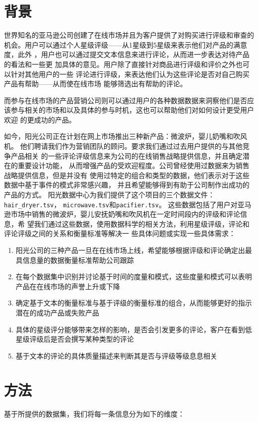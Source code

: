 \chapter{背景}
    世界知名的亚马逊公司创建了在线市场并且为客户提供了对购买进行评级和审查的
机会。用户可以通过个人星级评级——从1星级到5星级来表示他们对产品的满意度，此外
，用户也可以通过提交文本信息来进行评论，从而进一步表达对待产品的看法和一些更
加具体的意见。用户除了直接针对商品进行评级和评价之外也可以针对其他用户的一些
评论进行评级，来表达他们认为这些评论是否对自己购买产品有帮助——从而使在线市场
能够筛选出有帮助的评论。

    而参与在线市场的产品营销公司则可以通过用户的各种数据数据来洞察他们是否应
该参与相关的市场和以及具体的参与时机，这也可以帮助他们对如何设计更受用户欢迎
的更成功的产品。

    如今，阳光公司正在计划在网上市场推出三种新产品：微波炉，婴儿奶嘴和吹风机。
他们聘请我们作为营销团队的顾问。要求我们通过过去用户提供的与其他竞争产品相关
的一些评论评级信息来为公司的在线销售战略提供信息，并且确定潜在的重要设计功能，
从而增强产品的受欢迎程度。公司曾经使用过数据来为销售战略提供信息，但是并没有
使用过特定的组合和类型的数据，他们表示对于这些数据中基于事件的模式非常感兴趣，
并且希望能够得到有助于公司制作出成功的产品的方式。
阳光数据中心为我们提供了这个项目的三个数据文件：\texttt{hair\_dryer.tsv}，
\texttt{microwave.tsv}和\texttt{pacifier.tsv}。
这些数据包括了用户对亚马逊市场中销售的微波炉，婴儿安抚奶嘴和吹风机在一定时间段内的评级和评论信息，希
望我们通过这些数据，使用数据科学的相关方法，利用星级评级，评论和评论评级之间的关系和衡量标准等解决一
些具体问题或实现一些具体需求：
\begin{enumerate}
    \item 阳光公司的三种产品一旦在在线市场上线，希望能够根据评级和评论确定出最具信息量的数据衡量标准帮助公司跟踪
    \item 在每个数据集中识别并讨论基于时间的度量和模式，这些度量和模式可以表明产品在在线市场的声誉上升或下降
    \item 确定基于文本的衡量标准与基于评级的衡量标准的组合，从而能够更好的指示潜在的成功产品或失败产品
    \item 具体的星级评分能够带来怎样的影响，是否会引发更多的评论，客户在看到低星级评级后是否会撰写某种类型的评论
    \item 基于文本的评论的具体质量描述来判断其是否与评级等级息息相关
\end{enumerate}


\chapter{方法}
基于所提供的数据集，我们将每一条信息分为如下的维度：

